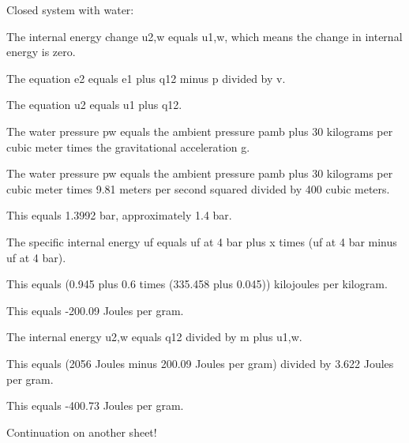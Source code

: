 Closed system with water:

The internal energy change u2,w equals u1,w, which means the change in internal energy is zero.

The equation e2 equals e1 plus q12 minus p divided by v.

The equation u2 equals u1 plus q12.

The water pressure pw equals the ambient pressure pamb plus 30 kilograms per cubic meter times the gravitational acceleration g.

The water pressure pw equals the ambient pressure pamb plus 30 kilograms per cubic meter times 9.81 meters per second squared divided by 400 cubic meters.

This equals 1.3992 bar, approximately 1.4 bar.

The specific internal energy uf equals uf at 4 bar plus x times (uf at 4 bar minus uf at 4 bar).

This equals (0.945 plus 0.6 times (335.458 plus 0.045)) kilojoules per kilogram.

This equals -200.09 Joules per gram.

The internal energy u2,w equals q12 divided by m plus u1,w.

This equals (2056 Joules minus 200.09 Joules per gram) divided by 3.622 Joules per gram.

This equals -400.73 Joules per gram.

Continuation on another sheet!